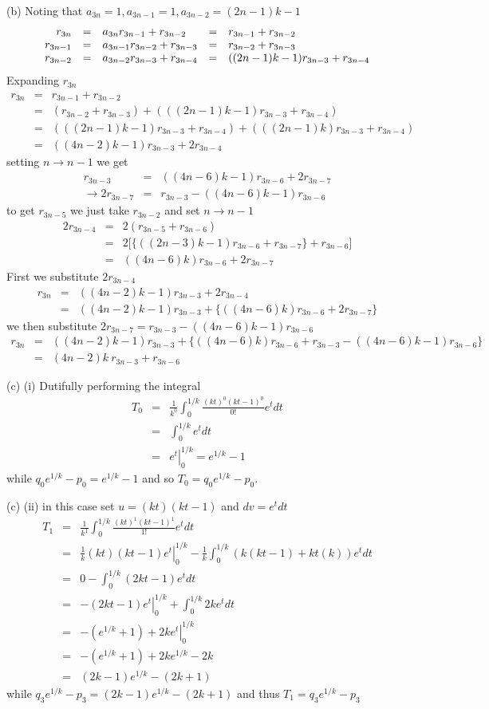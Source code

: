 \documentclass[aps,preprint,preprintnumbers,nofootinbib,showpacs,prd]{revtex4-1}
\newcommand{\nbea}{\begin{eqnarray*}}
\newcommand{\neea}{\end{eqnarray*}}
\begin{document}
(b) Noting that $a_{3n} = 1, a_{3n-1} = 1,  a_{3n-2} = (2n-1)k - 1$
%
\nbea
\begin{array}{r c l c l}
r_{3n} & = & a_{3n}r_{3n-1} + r_{3n-2} & = & r_{3n-1} + r_{3n-2} \\
r_{3n-1} & = & a_{3n-1}r_{3n-2} + r_{3n-3} & = & r_{3n-2} + r_{3n-3} \\
r_{3n-2} & = & a_{3n-2}r_{3n-3} + r_{3n-4} & = & ((2n-1)k - 1)r_{3n-3} + r_{3n-4}
\end{array}
\neea
%
Expanding $r_{3n}$
%
\nbea
r_{3n} & = & r_{3n-1} + r_{3n-2} \\
& = & (r_{3n-2} + r_{3n-3}) + (((2n-1)k - 1)r_{3n-3} + r_{3n-4}) \\
& = & (((2n-1)k - 1)r_{3n-3} + r_{3n-4}) + (((2n-1)k)r_{3n-3} + r_{3n-4}) \\
& = &  ((4n-2)k - 1)r_{3n-3} + 2r_{3n-4}
\neea
%
setting $n \to n-1$ we get
%
\nbea
r_{3n-3} & = & ((4n-6)k - 1)r_{3n-6} + 2r_{3n-7} \\
\to 2r_{3n-7} & = & r_{3n-3} - ((4n-6)k - 1)r_{3n-6}
\neea
%
to get $r_{3n-5}$ we just take $r_{3n-2}$ and set $n \to n - 1$
%
\nbea
2r_{3n-4} & = & 2 (r_{3n-5} + r_{3n-6}) \\
& = & 2 \lbrack \{((2n-3)k - 1)r_{3n-6} + r_{3n-7}\}  + r_{3n-6}\rbrack \\
& = & ((4n-6)k)r_{3n-6} + 2r_{3n-7}
\neea
%
First we substitute $2r_{3n-4}$
%
\nbea
r_{3n} & = & ((4n-2)k - 1)r_{3n-3} + 2r_{3n-4} \\
& = & ((4n-2)k - 1)r_{3n-3} + \{((4n-6)k)r_{3n-6} + 2r_{3n-7}\}
\neea
%
we then substitute $2r_{3n-7} = r_{3n-3} - ((4n-6)k - 1)r_{3n-6}$
%
\nbea
r_{3n} & = & ((4n-2)k - 1)r_{3n-3} + \{((4n-6)k)r_{3n-6} + r_{3n-3} - ((4n-6)k - 1)r_{3n-6}\} \\
& = & (4n-2)k ~ r_{3n-3} + r_{3n-6}
\neea
%

(c) (i) Dutifully performing the integral
%
\nbea
T_0 & = & \frac{1}{k^0} \int_0^{1/k} \frac{(kt)^0 (kt - 1)^0}{0!}e^tdt \\
& = & \int_0^{1/k} e^tdt \\
& = & \left. e^t\right|^{1/k}_0 = e^{1/k} - 1
\neea
%
while $q_0e^{1/k} - p_0 = e^{1/k} - 1$ and so $T_0 = q_0e^{1/k} - p_0$.

(c) (ii) in this case set $u = (kt) (kt - 1)$ and $dv = e^tdt$
%
\nbea
T_1 & = & \frac{1}{k^1} \int_0^{1/k} \frac{(kt)^1 (kt - 1)^1}{1!}e^tdt \\
& = & \left. \frac{1}{k} (kt) (kt - 1)e^t\right|^{1/k}_0 - \frac{1}{k} \int_0^{1/k} (k(kt - 1) + kt(k)) e^t dt \\
& = & 0 - \int_0^{1/k} (2kt - 1) e^t dt \\
& = & \left.-(2kt - 1) e^t\right|^{1/k}_0 + \int_0^{1/k} 2k e^t dt \\
& = & -(e^{1/k} + 1) + \left. 2ke^t \right|^{1/k}_0 \\
& = & -(e^{1/k} + 1) + 2ke^{1/k} - 2k \\
& = & (2k - 1)e^{1/k} - (2k+1)
\neea
%
while $q_3e^{1/k} - p_3 = (2k - 1)e^{1/k} - (2k+1)$ and thus $T_1 = q_3e^{1/k} - p_3$
\end{document}
